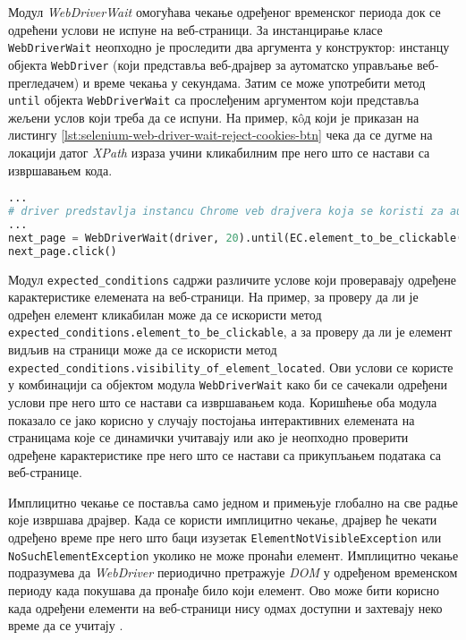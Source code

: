 \documentclass[12pt,oneside]{memoir}
\begin{document}
Модул \textit{WebDriverWait} омогућава чекање одређеног временског периода док се одрећени услови не испуне на веб-страници. За инстанцирање класе \texttt{WebDriverWait} неопходно је проследити два аргумента у конструктор: инстанцу објекта \texttt{WebDriver} (који представља веб-драјвер за аутоматско управљање веб-прегледачем) и време чекања у секундама.
Затим се може употребити метод \texttt{until} објекта \texttt{WebDriverWait} са прослеђеним аргументом који представља жељени услов који треба да се испуни. На пример, кôд који је приказан на листингу \ref{lst:selenium-web-driver-wait-reject-cookies-btn} чека да се дугме на локацији датог \textit{XPath} израза учини кликабилним пре него што се настави са извршавањем кода. 
\begin{lstlisting}[language=Python, caption={Симулација клика на елемент}, label={lst:selenium-web-driver-wait-reject-cookies-btn}]
...
# driver predstavlja instancu Chrome veb drajvera koja se koristi za automatizaciju pregledaca
...
next_page = WebDriverWait(driver, 20).until(EC.element_to_be_clickable((By.XPATH, '//span[contains(@class, "nextButton")]')))
next_page.click()
\end{lstlisting}

Модул \texttt{expected\_conditions} садржи различите услове који проверавају одређене карактеристике елемената на веб-страници. На пример, за проверу да ли је одређен елемент кликабилан може да се искористи метод\\ \texttt{expected\_conditions.element\_to\_be\_clickable}, а за проверу да ли је елемент видљив на страници може да се искористи метод\\ \texttt{expected\_conditions.visibility\_of\_element\_located}.
Ови услови се користе у комбинацији са објектом модула \texttt{WebDriverWait} како би се сачекали одређени услови пре него што се настави са извршавањем кода.
Коришћење оба модула показало се јако корисно у случају постојања интерактивних елемената на страницама које се динамички учитавају или ако је неопходно проверити одређене карактеристике пре него што се настави са прикупљањем података са веб-странице.

Имплицитно чекање се поставља само једном и примењује глобално на све радње које извршава драјвер. Када се користи имплицитно чекање, драјвер ће чекати одређено време пре него што баци изузетак \texttt{ElementNotVisibleException} или \texttt{NoSuchElementException} уколико не може пронаћи елемент. Имплицитно чекање подразумева да \textit{WebDriver} периодично претражује \textit{DOM} у одређеном временском периоду када покушава да пронађе било који елемент. Ово може бити корисно када одређени елементи на веб-страници нису одмах доступни и захтевају неко време да се учитају \cite{selenium}.
\end{document}
